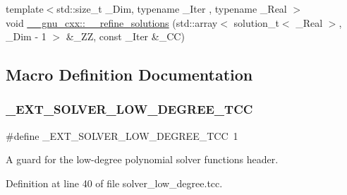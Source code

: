 \begin{DoxyCompactItemize}
\item 
{\footnotesize template$<$std\+::size\+\_\+t \+\_\+\+Dim, typename \+\_\+\+Iter , typename \+\_\+\+Real $>$ }\\void \hyperlink{namespace____gnu__cxx_aa8dd4c7542667cc5a8e435ca53d6fad7}{\+\_\+\+\_\+gnu\+\_\+cxx\+::\+\_\+\+\_\+refine\+\_\+solutions} (std\+::array$<$ solution\+\_\+t$<$ \+\_\+\+Real $>$, \+\_\+\+Dim -\/ 1 $>$ \&\+\_\+\+ZZ, const \+\_\+\+Iter \&\+\_\+\+CC)
\end{DoxyCompactItemize}


\subsection{Macro Definition Documentation}
\mbox{\label{solver__low__degree_8tcc_a10202d26918e17d656cf14da05e26477}} 
\subsubsection{\texorpdfstring{\+\_\+\+E\+X\+T\+\_\+\+S\+O\+L\+V\+E\+R\+\_\+\+L\+O\+W\+\_\+\+D\+E\+G\+R\+E\+E\+\_\+\+T\+CC}{\_EXT\_SOLVER\_LOW\_DEGREE\_TCC}}
{\footnotesize\ttfamily \#define \+\_\+\+E\+X\+T\+\_\+\+S\+O\+L\+V\+E\+R\+\_\+\+L\+O\+W\+\_\+\+D\+E\+G\+R\+E\+E\+\_\+\+T\+CC~1}



A guard for the low-\/degree polynomial solver functions header. 



Definition at line 40 of file solver\+\_\+low\+\_\+degree.\+tcc.

